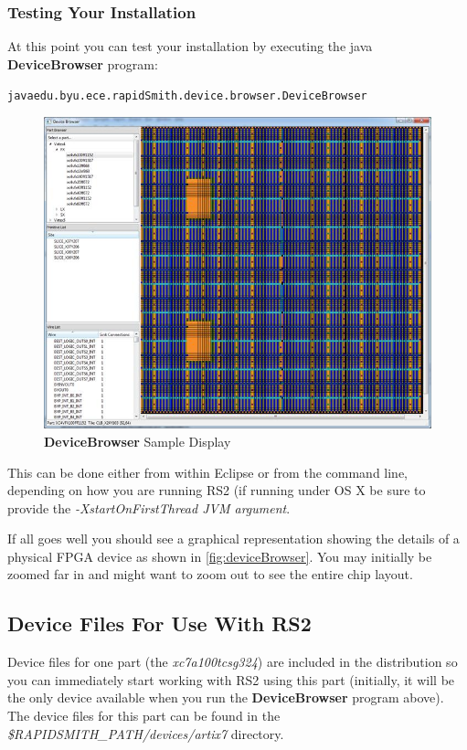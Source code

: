 \documentclass[12pt]{article}
\newcommand{\opt}[1]{{\em #1}}
\newcommand{\pgm}[1]{{\textbf{#1}}}
\newcommand{\dir}[1]{{\em #1}}
\newenvironment{code}{\begin{center} \begin{minipage}{6in} \noindent \begin{alltt}}{\end{alltt} \end{minipage} \end{center}}
\begin{document}
\subsubsection{Testing Your Installation}
\noindent At this point you can test your installation by executing the java
\pgm{DeviceBrowser} program: 
\vspace{-0.15in}  \begin{code}
java edu.byu.ece.rapidSmith.device.browser.DeviceBrowser
\end{code}    

\begin{figure}[htb]
\centering
\includegraphics[width=0.8\columnwidth]{deviceBrowser}
\caption{\pgm{DeviceBrowser} Sample Display}
\label{fig:deviceBrowser}
\end{figure}

\noindent This can be done either from within Eclipse or from the command line,
depending on how you are running RS2 (if running under OS X be sure to provide the
\opt{-XstartOnFirstThread JVM argument}.

If all goes well you should see a graphical representation showing the details
of a physical FPGA device as shown in \autoref{fig:deviceBrowser}.  You may
initially be zoomed far in and might want to zoom out to see the entire chip
layout.

\subsection{Device Files For Use With RS2}
Device files for one part (the {\em xc7a100tcsg324}) are included in the
distribution so you can immediately start working with RS2 using this part (initially, it
will be the only device available when you run the \pgm{DeviceBrowser} program
above).  The device files for this part can be found in the
\dir{\${RAPIDSMITH\_PATH}/devices/artix7} directory.               
\end{document}
